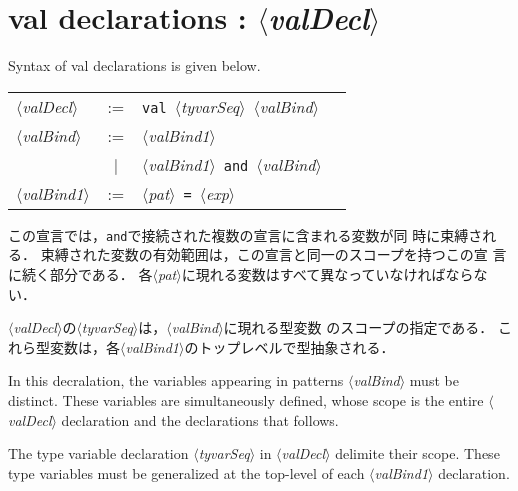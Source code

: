 \documentclass{jbook}
\newcommand{\txt}[2]{#2}
\newcommand{\vbar}{\mbox{\ $|$\ }}
\newcommand{\nonterm}[1]{\mbox{$\langle$}{\it #1}\mbox{$\rangle$}}
\newcommand{\term}[1]{\mbox{{\tt #1}}}
\begin{document}
\section{\txt{val宣言}{val declarations} : \nonterm{valDecl}}
\label{sec:syntax:valBind}

\txt{val宣言の構文は，以下の文法で定義される．}
    {Syntax of val declarations is given below.}

\begin{center}
\begin{tabular}{lcll}
\nonterm{valDecl}  &:=   & \term{val}\ \nonterm{tyvarSeq}\ \nonterm{valBind}\\
\nonterm{valBind}  &:=   & \nonterm{valBind1} \\
                   &\vbar& \nonterm{valBind1}\ \term{and}\ \nonterm{valBind}
\\
\nonterm{valBind1} &:=   & \nonterm{pat}\ \term{=}\ \nonterm{exp}\\
\end{tabular}
\end{center}

\ifjp%
	この宣言では，\term{and}で接続された複数の宣言に含まれる変数が同
時に束縛される．	
	束縛された変数の有効範囲は，この宣言と同一のスコープを持つこの宣
言に続く部分である．
	各\nonterm{pat}に現れる変数はすべて異なっていなければならない．

	\nonterm{valDecl}の\nonterm{tyvarSeq}は，\nonterm{valBind}に現れる型変数
のスコープの指定である．
	これら型変数は，各\nonterm{valBind1}のトップレベルで型抽象される．

\else%
	In this decralation, the variables appearing in patterns
\nonterm{valBind} must be distinct.
	These variables are simultaneously defined, whose scope is the
entire \nonterm{valDecl} declaration and the declarations that follows.

	The type variable declaration \nonterm{tyvarSeq} in
\nonterm{valDecl} delimite their scope.
	These type variables must be generalized at the top-level of
each \nonterm{valBind1} declaration.
\fi%
\end{document}
